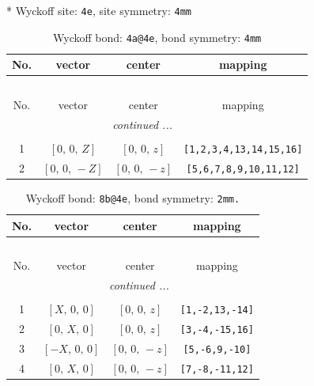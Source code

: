 \documentclass[fleqn,8pt]{jsarticle}
\begin{document}
* Wyckoff site: {\tt 4e}, site symmetry: {\tt 4mm}
\renewcommand{\arraystretch}{1.2}
\begin{longtable}{cccc}
\caption{Wyckoff bond: {\tt 4a@4e}, bond symmetry: {\tt 4mm}}
 \\
 \hline \hline
No. & vector & center & mapping \\ \hline \endfirsthead

\multicolumn{3}{l}{\tablename\ \thetable{}} \\
 \hline \hline
No. & vector & center & mapping \\ \hline \endhead

 \hline \hline
\multicolumn{3}{r}{\footnotesize\it continued ...} \\ \endfoot

 \hline \hline
\multicolumn{3}{r}{} \\ \endlastfoot

1 & $\left[ 0,\, 0,\, Z \right]$ & $\left[ 0,\, 0,\, z \right]$ & {\tt [1,2,3,4,13,14,15,16]} \\ \hline
2 & $\left[ 0,\, 0,\, - Z \right]$ & $\left[ 0,\, 0,\, - z \right]$ & {\tt [5,6,7,8,9,10,11,12]} \\
\end{longtable}
\renewcommand{\arraystretch}{1.2}
\begin{longtable}{cccc}
\caption{Wyckoff bond: {\tt 8b@4e}, bond symmetry: {\tt 2mm.}}
 \\
 \hline \hline
No. & vector & center & mapping \\ \hline \endfirsthead

\multicolumn{3}{l}{\tablename\ \thetable{}} \\
 \hline \hline
No. & vector & center & mapping \\ \hline \endhead

 \hline \hline
\multicolumn{3}{r}{\footnotesize\it continued ...} \\ \endfoot

 \hline \hline
\multicolumn{3}{r}{} \\ \endlastfoot

1 & $\left[ X,\, 0,\, 0 \right]$ & $\left[ 0,\, 0,\, z \right]$ & {\tt [1,-2,13,-14]} \\ \hline
2 & $\left[ 0,\, X,\, 0 \right]$ & $\left[ 0,\, 0,\, z \right]$ & {\tt [3,-4,-15,16]} \\ \hline
3 & $\left[ - X,\, 0,\, 0 \right]$ & $\left[ 0,\, 0,\, - z \right]$ & {\tt [5,-6,9,-10]} \\ \hline
4 & $\left[ 0,\, X,\, 0 \right]$ & $\left[ 0,\, 0,\, - z \right]$ & {\tt [7,-8,-11,12]} \\
\end{longtable}
\end{document}
